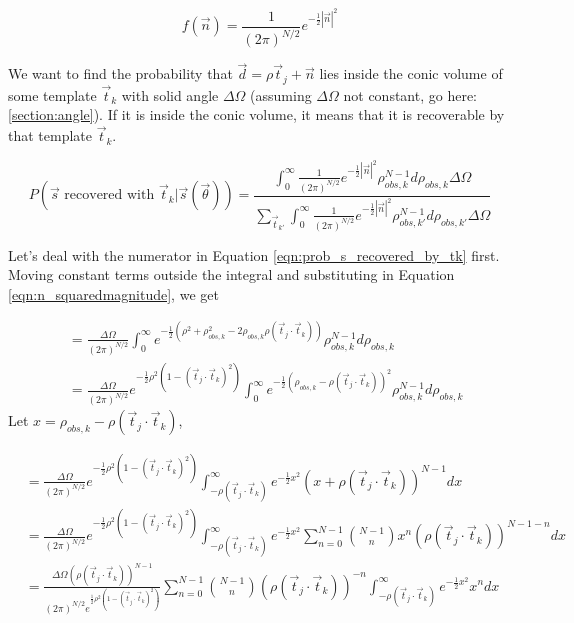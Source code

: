 \documentclass[12pt]{article}
\newcommand{\ptjtk}{\rho(\vec{t}_j\cdot\vec{t}_k)}
\begin{document}
   \begin{equation}
   f(\vec{n}) = \frac{1}{(2\pi)^{N/2}}e^{-\frac{1}{2}|\vec{n}|^2}
   \end{equation}

We want to find the probability that $\vec{d}=\rho\vec{t}_j+\vec{n}$ lies inside the conic volume of some template $\vec{t}_k$ with solid angle $\Delta\Omega$ (assuming $\Delta\Omega$ not constant, go here: \ref{section:angle}). If it is inside the conic volume, it means that it is recoverable by that template $\vec{t}_k$.

   \begin{equation}
   P(\text{$\vec{s}$ recovered with $\vec{t}_k$}|\vec{s}(\vec\theta)) = \frac{\int_0^\infty \frac{1}{(2\pi)^{N/2}} e^{-\frac{1}{2} |\vec{n}|^2} {\rho^{N-1}_{obs,k}} d\rho_{obs,k} \Delta\Omega}
   {\sum_{\vec{t}_{k'}} \int_0^\infty \frac{1}{(2\pi)^{N/2}} e^{-\frac{1}{2} |\vec{n}|^2} {\rho^{N-1}_{obs,k'}} d\rho_{obs,k'} \Delta\Omega}
   \label{eqn:prob_s_recovered_by_tk}
   \end{equation}

Let's deal with the numerator in Equation \ref{eqn:prob_s_recovered_by_tk} first. Moving constant terms outside the integral and substituting in Equation \ref{eqn:n_squaredmagnitude}, we get

   \begin{align}
   &= \frac{\Delta\Omega}{(2\pi)^{N/2}} \int_0^\infty  e^{-\frac{1}{2}( \rho^2 + \rho_{obs,k}^2 - 2\rho_{obs,k}\ptjtk)  } {\rho^{N-1}_{obs,k}} d\rho_{obs,k} \\
  &= \frac{\Delta\Omega}{(2\pi)^{N/2}} e^{-\frac{1}{2}\rho^2(1-(\vec{t}_j\cdot\vec{t}_k)^2)} \int_0^\infty  e^{-\frac{1}{2} (\rho_{obs,k} - \ptjtk)^2  } {\rho^{N-1}_{obs,k}} d\rho_{obs,k}
   \end{align}
Let $x = \rho_{obs,k} - \ptjtk$,

   \begin{align}
   &= \frac{\Delta\Omega}{(2\pi)^{N/2}} e^{-\frac{1}{2}\rho^2(1-(\vec{t}_j\cdot\vec{t}_k)^2)} \int_{-\ptjtk}^\infty  e^{-\frac{1}{2} x^2  } {(x+\ptjtk)^{N-1}} dx \\
   &= \frac{\Delta\Omega}{(2\pi)^{N/2}} e^{-\frac{1}{2}\rho^2(1-(\vec{t}_j\cdot\vec{t}_k)^2)} \int_{-\ptjtk}^\infty  e^{-\frac{1}{2} x^2  } {\sum_{n=0}^{N-1} \binom{N-1}{n}x^n(\ptjtk)^{N-1-n} } dx \\
   &= \frac{\Delta\Omega(\ptjtk)^{N-1}}{(2\pi)^{N/2}  e^{\frac{1}{2}\rho^2(1-(\vec{t}_j\cdot\vec{t}_k)^2)}}  \sum_{n=0}^{N-1} \binom{N-1}{n} (\ptjtk)^{-n} \int_{-\ptjtk}^\infty e^{-\frac{1}{2} x^2  } x^n  dx
   \end{align}
\end{document}
